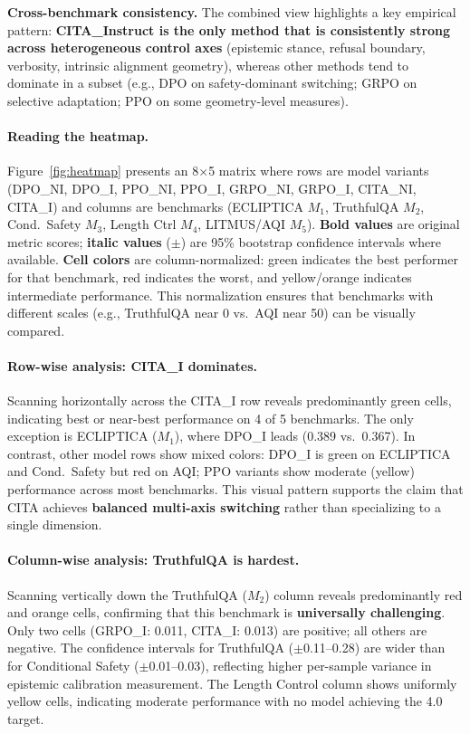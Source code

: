\vspace{-0.2em}
\noindent\textbf{Cross-benchmark consistency.}
The combined view highlights a key empirical pattern:
\textbf{\textsc{CITA}\_Instruct is the only method that is consistently strong across heterogeneous control axes}
(epistemic stance, refusal boundary, verbosity, intrinsic alignment geometry),
whereas other methods tend to dominate in a subset (e.g., DPO on safety-dominant switching; GRPO on selective adaptation; PPO on some geometry-level measures).

\paragraph{Reading the heatmap.}
Figure~\ref{fig:heatmap} presents an 8$\times$5 matrix where rows are model variants (DPO\_NI, DPO\_I, PPO\_NI, PPO\_I, GRPO\_NI, GRPO\_I, CITA\_NI, CITA\_I) and columns are benchmarks (ECLIPTICA $M_1$, TruthfulQA $M_2$, Cond.\ Safety $M_3$, Length Ctrl $M_4$, LITMUS/AQI $M_5$).
\textbf{Bold values} are original metric scores; \textbf{italic values} ($\pm$) are 95\% bootstrap confidence intervals where available.
\textbf{Cell colors} are column-normalized: green indicates the best performer for that benchmark, red indicates the worst, and yellow/orange indicates intermediate performance.
This normalization ensures that benchmarks with different scales (e.g., TruthfulQA near 0 vs.\ AQI near 50) can be visually compared.

\paragraph{Row-wise analysis: \textsc{CITA}\_I dominates.}
Scanning horizontally across the \textsc{CITA}\_I row reveals predominantly green cells, indicating best or near-best performance on 4 of 5 benchmarks.
The only exception is ECLIPTICA ($M_1$), where DPO\_I leads (0.389 vs.\ 0.367).
In contrast, other model rows show mixed colors: DPO\_I is green on ECLIPTICA and Cond.\ Safety but red on AQI; PPO variants show moderate (yellow) performance across most benchmarks.
This visual pattern supports the claim that \textsc{CITA} achieves \textbf{balanced multi-axis switching} rather than specializing to a single dimension.

\paragraph{Column-wise analysis: TruthfulQA is hardest.}
Scanning vertically down the TruthfulQA ($M_2$) column reveals predominantly red and orange cells, confirming that this benchmark is \textbf{universally challenging}.
Only two cells (GRPO\_I: 0.011, CITA\_I: 0.013) are positive; all others are negative.
The confidence intervals for TruthfulQA ($\pm$0.11--0.28) are wider than for Conditional Safety ($\pm$0.01--0.03), reflecting higher per-sample variance in epistemic calibration measurement.
The Length Control column shows uniformly yellow cells, indicating moderate performance with no model achieving the 4.0 target.

